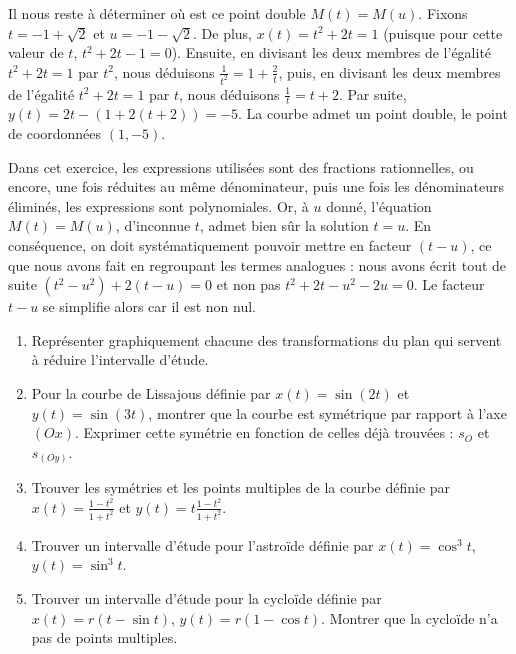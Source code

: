 \documentclass[class=report,crop=false]{standalone}
\begin{document}
\begin{exemple}
Il nous reste à déterminer où est ce point double $M(t)=M(u)$.
Fixons $t=-1+\sqrt{2}$ et $u=-1-\sqrt{2}$.
De plus, $x(t)=t^2+2t=1$ (puisque pour cette valeur de $t$, $t^2+2t-1=0$). Ensuite, en
divisant les deux membres de l'égalité $t^2+2t=1$
par $t^2$, nous déduisons  $\frac{1}{t^2}=1+\frac{2}{t}$,
puis, en divisant les deux membres de l'égalité $t^2+2t=1$ par $t$,
nous déduisons $\frac{1}{t}=t+2$. Par suite, $y(t)=2t-(1+2(t+2))=-5$.
La courbe admet un point double, le point de coordonnées $(1,-5)$.
\end{exemple}

\begin{remarque*}
Dans cet exercice, les expressions utilisées sont des fractions
rationnelles, ou encore, une fois réduites au même dénominateur,
puis une fois les dénominateurs éliminés, les expressions sont polynomiales.
Or, à $u$ donné, l'équation $M(t)=M(u)$, d'inconnue $t$, admet bien sûr la
solution $t=u$. En conséquence, on doit systématiquement pouvoir mettre en
facteur $(t-u)$, ce que nous avons fait en regroupant les termes analogues :
nous avons écrit tout de suite $(t^2-u^2)+2(t-u)=0$ et non pas $t^2+2t-u^2-2u=0$.
Le facteur $t-u$ se simplifie alors car il est non nul.
\end{remarque*}


\begin{miniexercices}
\sauteligne
\begin{enumerate}
  \item Représenter graphiquement chacune des transformations du plan
  qui servent à réduire l'intervalle d'étude.

  \item Pour la courbe de Lissajous définie par $x(t)=\sin(2t)$ et
  $y(t)=\sin(3t)$, montrer que la courbe est symétrique par rapport à
  l'axe $(Ox)$. Exprimer cette symétrie en fonction de celles déjà trouvées :
  $s_O$ et $s_{(Oy)}$.



  \item Trouver les symétries et les points multiples de la courbe définie par
  $x(t) = \frac{1-t^2}{1+t^2}$ et $y(t) = t \frac{1-t^2}{1+t^2}$.

  \item Trouver un intervalle d'étude pour l'astroïde définie par $x(t) = \cos^3 t$,
  $y(t) = \sin^3 t$.

  \item Trouver un intervalle d'étude pour la cycloïde définie par $x(t) = r(t-\sin t)$,
  $y(t) = r(1-\cos t)$. Montrer que la cycloïde n'a pas de points multiples.

\end{enumerate}
\end{miniexercices}
\end{document}
